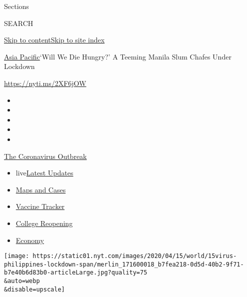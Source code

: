 Sections

SEARCH

\protect\hyperlink{site-content}{Skip to
content}\protect\hyperlink{site-index}{Skip to site index}

\href{/section/world/asia}{Asia Pacific}\textbar{}`Will We Die Hungry?'
A Teeming Manila Slum Chafes Under Lockdown

\url{https://nyti.ms/2XF6jOW}

\begin{itemize}
\item
\item
\item
\item
\item
\end{itemize}

\href{https://www.nytimes.com/news-event/coronavirus?action=click\&pgtype=Article\&state=default\&region=TOP_BANNER\&context=storylines_menu}{The
Coronavirus Outbreak}

\begin{itemize}
\tightlist
\item
  live\href{https://www.nytimes.com/2020/08/03/world/coronavirus-covid-19.html?action=click\&pgtype=Article\&state=default\&region=TOP_BANNER\&context=storylines_menu}{Latest
  Updates}
\item
  \href{https://www.nytimes.com/interactive/2020/us/coronavirus-us-cases.html?action=click\&pgtype=Article\&state=default\&region=TOP_BANNER\&context=storylines_menu}{Maps
  and Cases}
\item
  \href{https://www.nytimes.com/interactive/2020/science/coronavirus-vaccine-tracker.html?action=click\&pgtype=Article\&state=default\&region=TOP_BANNER\&context=storylines_menu}{Vaccine
  Tracker}
\item
  \href{https://www.nytimes.com/2020/08/02/us/covid-college-reopening.html?action=click\&pgtype=Article\&state=default\&region=TOP_BANNER\&context=storylines_menu}{College
  Reopening}
\item
  \href{https://www.nytimes.com/live/2020/08/03/business/stock-market-today-coronavirus?action=click\&pgtype=Article\&state=default\&region=TOP_BANNER\&context=storylines_menu}{Economy}
\end{itemize}

\texttt{[image: https://static01.nyt.com/images/2020/04/15/world/15virus-philippines-lockdown-span/merlin\_171600018\_b7fea218-0d5d-40b2-9f71-b7e40b6d83b0-articleLarge.jpg?quality=75\\\&auto=webp\\\&disable=upscale]}

